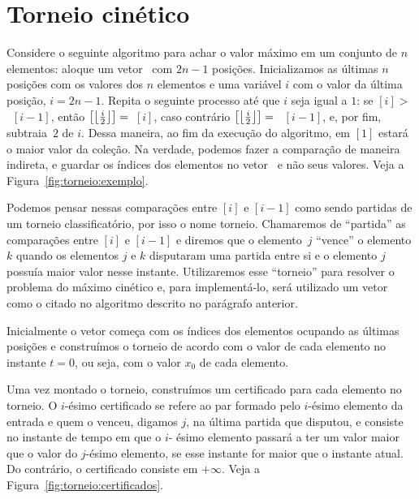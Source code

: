 
\newcommand{\thickness}{0.75mm}
\FloatBarrier


\section{Torneio cinético} \label{sec:torneio}

Considere o seguinte algoritmo para achar o valor máximo em um
conjunto de $n$ elementos: aloque um vetor \torneio~com $2n - 1$
posições.
Inicializamos as últimas $n$ posições com os valores dos $n$ elementos e uma variável $i$ com o
valor da última posição, $i = 2n - 1$.
Repita o seguinte processo até que $i$ seja igual a $1$: se \torneio$[i] > $~\torneio$[i - 1]$,
então \torneio$\left[\left\lfloor \frac{i}{2} \right\rfloor\right] =$~\torneio$[i]$, caso contrário
\torneio$\left[\left\lfloor \frac{i}{2} \right\rfloor\right] =$~ \torneio$[i - 1]$, e, por fim, subtraia~$2$ de $i$.
Dessa maneira, ao fim da execução do algoritmo, em \torneio$[1]$ estará o maior valor da coleção.
Na verdade, podemos fazer a comparação de maneira indireta, e guardar os índices dos elementos no
vetor \torneio~e não seus valores.
Veja a Figura~\ref{fig:torneio:exemplo}.



Podemos pensar nessas comparações entre \torneio$[i]$ e \torneio$[i-1]$ como sendo partidas de um
torneio classificatório, por isso o nome torneio.
Chamaremos de ``partida'' as comparações entre \torneio$[i]$ e \torneio$[i-1]$ e diremos que o
elemento~$j$ ``vence'' o elemento $k$ quando os elementos $j$ e $k$ disputaram uma partida entre
si e o elemento $j$ possuía maior valor nesse instante.
Utilizaremos esse ``torneio'' para resolver o problema do máximo cinético e, para implementá-lo,
será utilizado um vetor como o citado no algoritmo descrito no parágrafo anterior.

Inicialmente o vetor começa com os índices dos elementos ocupando as últimas posições e
construímos o torneio de acordo com o valor de cada elemento no instante $t = 0$, ou seja, com o
valor $x_0$ de cada elemento.

Uma vez montado o torneio, construímos um certificado para cada elemento no torneio.
O $i$-ésimo certificado se refere ao par formado pelo $i$-ésimo elemento da entrada e quem o
venceu, digamos $j$, na última partida que disputou, e consiste no instante de tempo em que o $i$-
ésimo elemento passará a ter um valor maior que o valor do $j$-ésimo elemento, se esse instante
for maior que o instante atual.
Do contrário, o certificado consiste em $+\infty$.
Veja a Figura~\ref{fig:torneio:certificados}.

